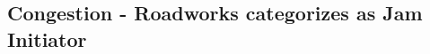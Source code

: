 \subsection{Congestion - Roadworks categorizes as Jam Initiator}
\label{analysis_processing_correlation_arbis_initiator}
